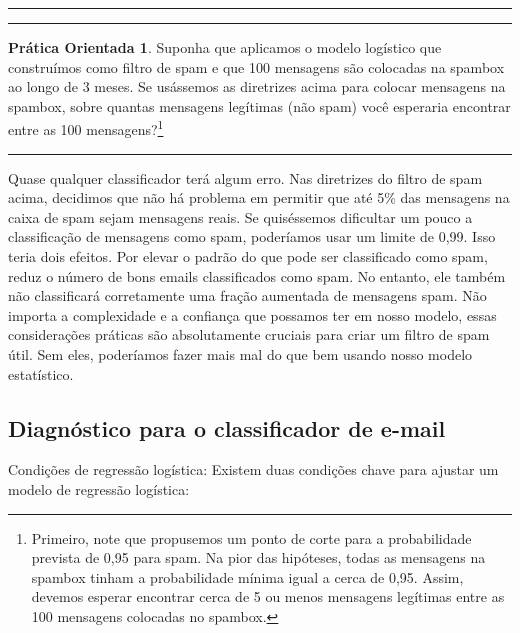 \documentclass[
]{book}
\theoremstyle{definition}
\theoremstyle{definition}
\theoremstyle{definition}
\newtheorem{exercise}{Prática Orientada}[chapter]
\theoremstyle{definition}
\theoremstyle{remark}
\begin{document}
\begin{center}\rule{0.5\linewidth}{0.5pt}\end{center}

\begin{center}\rule{0.5\linewidth}{0.5pt}\end{center}

\begin{exercise}
\protect\hypertarget{exr:unnamed-chunk-300}{}{\label{exr:unnamed-chunk-300} }Suponha que aplicamos o modelo logístico que construímos como filtro de spam e que 100 mensagens são colocadas na spambox ao longo de 3 meses. Se usássemos as diretrizes acima para colocar mensagens na spambox, sobre quantas mensagens legítimas (não spam) você esperaria encontrar entre as 100 mensagens?\footnote{Primeiro, note que propusemos um ponto de corte para a probabilidade prevista de 0,95 para spam. Na pior das hipóteses, todas as mensagens na spambox tinham a probabilidade mínima igual a cerca de 0,95. Assim, devemos esperar encontrar cerca de 5 ou menos mensagens legítimas entre as 100 mensagens colocadas no spambox.}
\end{exercise}

\begin{center}\rule{0.5\linewidth}{0.5pt}\end{center}

Quase qualquer classificador terá algum erro. Nas diretrizes do filtro de spam acima, decidimos que não há problema em permitir que até 5\% das mensagens na caixa de spam sejam mensagens reais. Se quiséssemos dificultar um pouco a classificação de mensagens como spam, poderíamos usar um limite de 0,99. Isso teria dois efeitos. Por elevar o padrão do que pode ser classificado como spam, reduz o número de bons emails classificados como spam. No entanto, ele também não classificará corretamente uma fração aumentada de mensagens spam. Não importa a complexidade e a confiança que possamos ter em nosso modelo, essas considerações práticas são absolutamente cruciais para criar um filtro de spam útil. Sem eles, poderíamos fazer mais mal do que bem usando nosso modelo estatístico.

\hypertarget{diagnosticsForTheEmailSorter}{%
\subsection{Diagnóstico para o classificador de e-mail}\label{diagnosticsForTheEmailSorter}}

Condições de regressão logística: Existem duas condições chave para ajustar um modelo de regressão logística:
\end{document}
